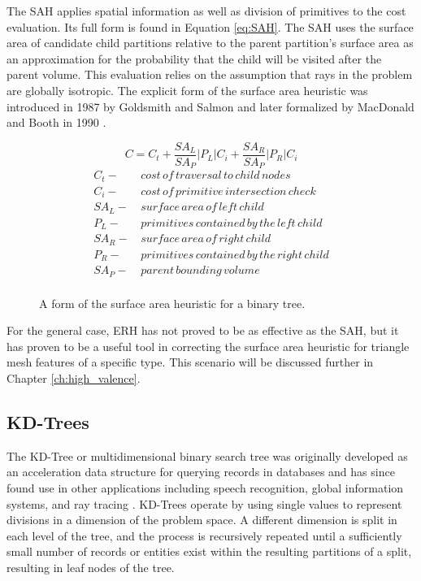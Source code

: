 The SAH applies spatial information as well as division of primitives to the
cost evaluation. Its full form is found in Equation \ref{eq:SAH}. The SAH uses
the surface area of candidate child partitions relative to the parent
partition's surface area as an approximation for the probability that the child
will be visited after the parent volume. This evaluation relies on the
assumption that rays in the problem are globally isotropic. The explicit form of
the surface area heuristic was introduced in 1987 by Goldsmith and Salmon
\cite{Goldsmith_1987} and later formalized by MacDonald and Booth in 1990
\cite{MacDonald_1990}.

\begin{figure}[H]
  \begin{equation}
    C =  C_{t} + \frac{SA_{L}}{SA_{P}} |P_{L}|C_{i} +  \frac{SA_{R}}{SA_{P}} |P_{R}|C_{i}
    \label{eq:SAH}
  \end{equation}
  \begin{align*}
    C_{t} - & \,cost\, of\, traversal\, to\, child\, nodes \\
    C_{i} - & \, cost\, of\, primitive\, intersection\, check\, \\
    SA_{L} - &  \,surface\, area\, of\, left\, child \\
    P_{L} - & \, primitives\, contained\, by\, the\, left\, child  \\
    SA_{R} - & \, surface\, area\, of\, right\, child \\
    P_{R} - & \, primitives\, contained\, by\, the\, right\, child \\
    SA_{P} - & \, parent\, bounding\, volume \\
  \end{align*}
  \caption{A form of the surface area heuristic for a binary tree.}
  \label{fig:SAH}
\end{figure}

For the general case, ERH has not proved to be as effective as the SAH, but it
has proven to be a useful tool in correcting the surface area heuristic for
triangle mesh features of a specific type. This scenario will be discussed further
in Chapter \ref{ch:high_valence}.

\subsection{KD-Trees}
\label{subsec:kd-trees}
The KD-Tree or multidimensional binary search tree was originally developed as
an acceleration data structure for querying records in databases and has since
found use in other applications including speech recognition, global information
systems, and ray tracing \cite{Bentley_1975}. KD-Trees operate by using single
values to represent divisions in a dimension of the problem space. A different
dimension is split in each level of the tree, and the process is recursively
repeated until a sufficiently small number of records or entities exist within
the resulting partitions of a split, resulting in leaf nodes of the tree.

